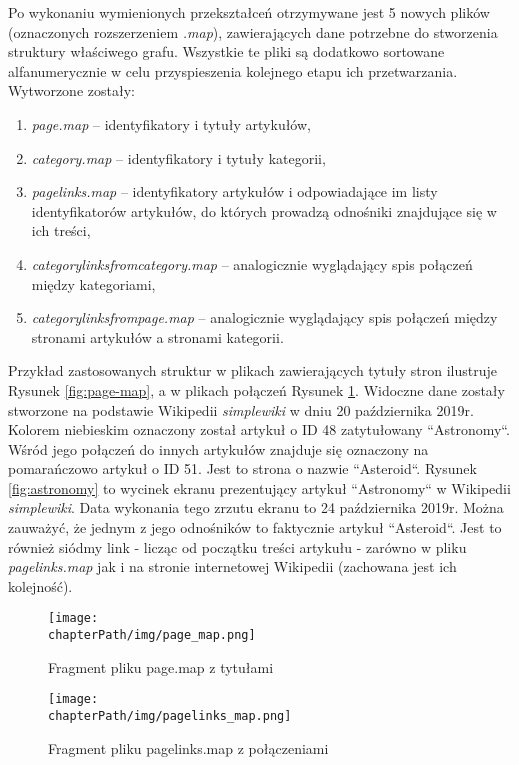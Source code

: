 Po wykonaniu wymienionych przekształceń otrzymywane jest 5 nowych plików (oznaczonych rozszerzeniem \textit{.map}), zawierających dane potrzebne do stworzenia struktury właściwego grafu. Wszystkie te pliki są dodatkowo sortowane alfanumerycznie w celu przyspieszenia kolejnego etapu ich przetwarzania. Wytworzone zostały:

\begin{enumerate}[label=\textbullet]
    \item \textit{page.map} – identyfikatory i tytuły artykułów,
    \item \textit{category.map} – identyfikatory i tytuły kategorii,
    \item \textit{pagelinks.map} – identyfikatory artykułów i odpowiadające im listy identyfikatorów artykułów, do których prowadzą odnośniki znajdujące się w ich treści,
    \item \textit{categorylinksfromcategory.map} – analogicznie wyglądający spis połączeń między kategoriami,
    \item \textit{categorylinksfrompage.map} – analogicznie wyglądający spis połączeń między stronami artykułów a stronami kategorii.
\end{enumerate}

Przykład zastosowanych struktur w plikach zawierających tytuły stron ilustruje Rysunek \ref{fig:page-map}, a w plikach połączeń Rysunek \ref{fig:pagelinks-map}. Widoczne dane zostały stworzone na podstawie Wikipedii \textit{simplewiki} w dniu 20 października 2019r. Kolorem niebieskim oznaczony został artykuł o ID 48 zatytułowany ``Astronomy``. Wśród jego połączeń do innych artykułów znajduje się oznaczony na pomarańczowo artykuł o ID 51. Jest to strona o nazwie ``Asteroid``. Rysunek \ref{fig:astronomy} to wycinek ekranu prezentujący artykuł ``Astronomy`` w Wikipedii \textit{simplewiki}. Data wykonania tego zrzutu ekranu to 24 października 2019r. Można zauważyć, że jednym z jego odnośników to faktycznie artykuł ``Asteroid``. Jest to również siódmy link - licząc od początku treści artykułu - zarówno w pliku \textit{pagelinks.map} jak i na stronie internetowej Wikipedii (zachowana jest ich kolejność).

\begin{figure}[!h]
    \begin{minipage}[b]{0.3\linewidth}
        \texttt{[image: \\chapterPath/img/page\_map.png]}
        \caption{\small Fragment pliku page.map z tytułami}
        \label{fig:page-map}
    \end{minipage}
    \begin{minipage}[b]{0.7\linewidth}
        \texttt{[image: \\chapterPath/img/pagelinks\_map.png]}
        \caption{\small Fragment pliku pagelinks.map z połączeniami}
        \label{fig:pagelinks-map}
    \end{minipage}
\end{figure}

